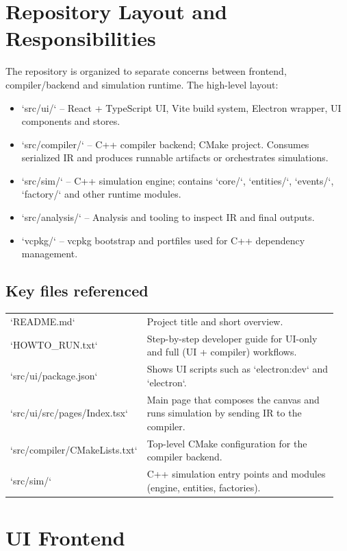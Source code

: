 \documentclass[11pt,a4paper]{article}
\begin{document}
\newpage

\section{Repository Layout and Responsibilities}

The repository is organized to separate concerns between frontend, compiler/backend and simulation runtime. The high-level layout:

\begin{itemize}
  \item `src/ui/` -- React + TypeScript UI, Vite build system, Electron wrapper, UI components and stores.
  \item `src/compiler/` -- C++ compiler backend; CMake project. Consumes serialized IR and produces runnable artifacts or orchestrates simulations.
  \item `src/sim/` -- C++ simulation engine; contains `core/`, `entities/`, `events/`, `factory/` and other runtime modules.
  \item `src/analysis/` -- Analysis and tooling to inspect IR and final outputs.
  \item `vcpkg/` -- vcpkg bootstrap and portfiles used for C++ dependency management.
\end{itemize}

\subsection{Key files referenced}
\begin{longtable}{p{0.25\linewidth} p{0.7\linewidth}}
`README.md` & Project title and short overview.\\
`HOWTO_RUN.txt` & Step-by-step developer guide for UI-only and full (UI + compiler) workflows.\\
`src/ui/package.json` & Shows UI scripts such as `electron:dev` and `electron`.\\
`src/ui/src/pages/Index.tsx` & Main page that composes the canvas and runs simulation by sending IR to the compiler.\\
`src/compiler/CMakeLists.txt` & Top-level CMake configuration for the compiler backend.\\
`src/sim/` & C++ simulation entry points and modules (engine, entities, factories).\\
\end{longtable}

\newpage

\section{UI Frontend}
\end{document}

